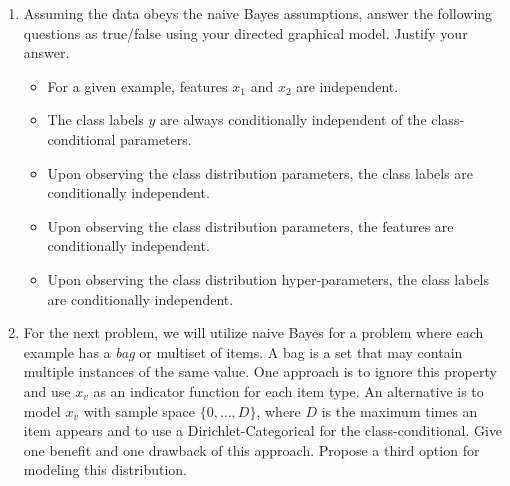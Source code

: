 \begin{problem}
\begin{enumerate}[label=(\alph*)]
\item Assuming the data obeys the naive Bayes assumptions, answer the following questions as true/false using your directed graphical model.  Justify your answer.

      \begin{itemize}
      \item For a given example, features $x_1$ and $x_2$ are independent.
      \item The class labels $y$ are always conditionally independent of the class-conditional parameters.
      \item Upon observing the class distribution parameters, the class labels are conditionally independent.
      \item Upon observing the class distribution parameters, the features are conditionally independent.
      \item Upon observing the class distribution hyper-parameters, the class labels are conditionally independent.
      \end{itemize}


    \item For the next problem, we will utilize naive Bayes for a
      problem where each example has a \textit{bag} or multiset of
      items. A bag is a set that may contain multiple instances of the
      same value. One approach is to ignore this property and use
      $x_v$ as an indicator function for each item type. An
      alternative is to model $x_v$ with sample space
      $\{0,\ldots, D\}$, where $D$ is the maximum times an item
      appears and to use a Dirichlet-Categorical for the
      class-conditional.  Give one benefit and one drawback of this
      approach. Propose a third option for modeling this distribution.

\end{enumerate}
\end{problem}
